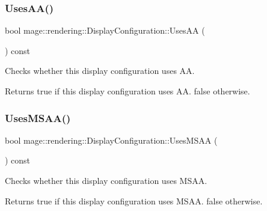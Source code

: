 \subsubsection{\texorpdfstring{Uses\+A\+A()}{UsesAA()}}
{\footnotesize\ttfamily bool mage\+::rendering\+::\+Display\+Configuration\+::\+Uses\+AA (\begin{DoxyParamCaption}{ }\end{DoxyParamCaption}) const\hspace{0.3cm}{\ttfamily [noexcept]}}

Checks whether this display configuration uses AA.

\begin{DoxyReturn}{Returns}
{\ttfamily true} if this display configuration uses AA. {\ttfamily false} otherwise. 
\end{DoxyReturn}
\hypertarget{classmage_1_1rendering_1_1_display_configuration_a1cd8c25ade06ad47945ca0046e350749}{}\label{classmage_1_1rendering_1_1_display_configuration_a1cd8c25ade06ad47945ca0046e350749} 
\subsubsection{\texorpdfstring{Uses\+M\+S\+A\+A()}{UsesMSAA()}}
{\footnotesize\ttfamily bool mage\+::rendering\+::\+Display\+Configuration\+::\+Uses\+M\+S\+AA (\begin{DoxyParamCaption}{ }\end{DoxyParamCaption}) const\hspace{0.3cm}{\ttfamily [noexcept]}}

Checks whether this display configuration uses M\+S\+AA.

\begin{DoxyReturn}{Returns}
{\ttfamily true} if this display configuration uses M\+S\+AA. {\ttfamily false} otherwise. 
\end{DoxyReturn}
\hypertarget{classmage_1_1rendering_1_1_display_configuration_ad233d7838a302fa0ce73cf06b1660404}{}\label{classmage_1_1rendering_1_1_display_configuration_ad233d7838a302fa0ce73cf06b1660404} 
